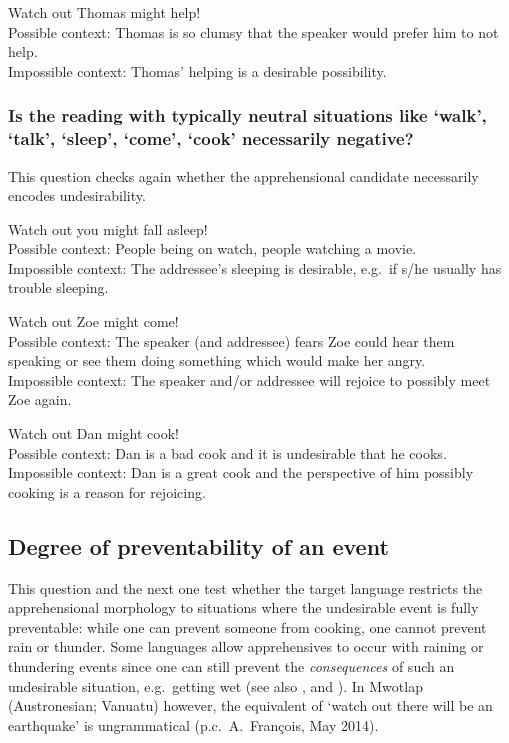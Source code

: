 \documentclass[output=paper,colorlinks,citecolor=brown]{langscibook}
\begin{document}
\ea \label{p5} {\op}Watch out{\cp} Thomas might help! \\
\textnormal{Possible context: Thomas is so clumsy that the speaker would prefer him to not help.} \\
\textnormal{Impossible context: Thomas' helping is a desirable possibility.}
\z


\subsubsection{Is the reading with \textbf{typically neutral situations} like `walk', `talk', `sleep', `come', `cook' necessarily negative?}

This question checks again whether the apprehensional candidate necessarily encodes undesirability.
\label{1.1.3}

\ea \label{p6} {\op}Watch out{\cp} you might fall asleep!\\
\textnormal{Possible context: People being on watch, people watching a movie. }\\
\textnormal{Impossible context: The addressee's sleeping is desirable, e.g.\ if s/he usually has trouble sleeping.}
\z

\ea \label{p7} {\op}Watch out{\cp} Zoe might come! \\
\textnormal{Possible context: The speaker (and addressee) fears Zoe could hear them speaking or see them doing something which would make her angry.} \\
\textnormal{Impossible context: The speaker and/or addressee will rejoice to possibly meet Zoe again.}
\z

\ea \label{p8} {\op}Watch out{\cp} Dan might cook! \\
\textnormal{Possible context: Dan is a bad cook and it is undesirable that he cooks.} \\
\textnormal{Impossible context: Dan is a great cook and the perspective of him possibly cooking is a reason for rejoicing.}
\z

\subsection{Degree of preventability of an event}
\label{subsec:apprpreventability}

This question and the next one test whether the target language restricts the apprehensional morphology to situations where the undesirable event is fully preventable: while one can prevent someone from cooking, one cannot prevent rain or thunder. Some languages allow apprehensives to occur with raining or thundering events since one can still prevent the \textit{consequences} of such an undesirable situation, e.g.\ getting wet (see also \cite[274]{vuillermet2018a}, and \cite{chapters/fedotov}). In Mwotlap (Austronesian; Vanuatu) however, the equivalent of ‘watch out there will be an earthquake' is ungrammatical (p.c.\ A.\ François, May 2014).
\end{document}
